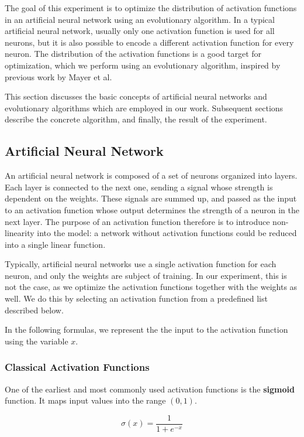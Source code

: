 The goal of this experiment is to optimize the distribution of activation
functions in an artificial neural network using an evolutionary algorithm.
In a typical artificial neural network, usually only one activation function
is used for all neurons, but it is also possible to encode a different
activation function for every neuron.  The distribution of the activation
functions is a good target for optimization, which we perform using an
evolutionary algorithm, inspired by previous work by Mayer et
al.\cite{Mayer2000}

This section discusses the basic concepts of artificial neural networks
and evolutionary algorithms which are employed in our work.  Subsequent
sections describe the concrete algorithm, and finally, the result of the
experiment.

\subsection{Artificial Neural Network}
An artificial neural network is composed of a set of neurons organized into
layers.  Each layer is connected to the next one, sending a signal whose
strength is dependent on the weights.  These signals are summed up,
and passed as the input to an activation function whose output determines
the strength of a neuron in the next layer.  The purpose of an activation
function therefore is to introduce non-linearity into the model: a network
without activation functions could be reduced into a single linear function.

Typically, artificial neural networks use a single activation function for
each neuron, and only the weights are subject of training.  In our
experiment, this is not the case, as we optimize the activation functions
together with the weights as well.  We do this by selecting an activation
function from a predefined list described below.

In the following formulas, we represent the the input to the activation
function using the variable $x$.

\subsubsection{Classical Activation Functions}

One of the earliest and most commonly used activation functions is the
\textbf{sigmoid} function. It maps input values into the range $(0, 1)$.

\begin{equation}
\sigma(x) = \frac{1}{1 + e^{-x}}
\end{equation}

